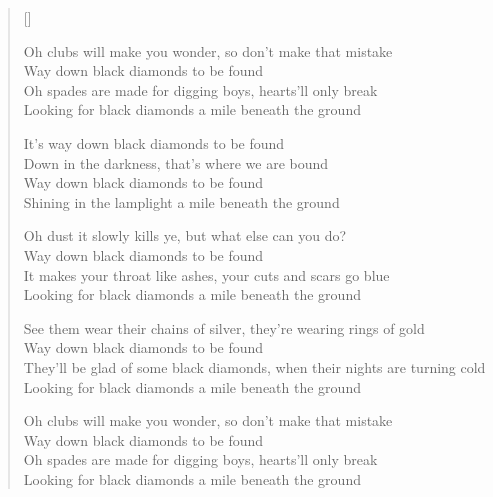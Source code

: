 \pagebreak
\settowidth{\versewidth}{See them wear their chains of silver, they're wearing rings of gold}
\begin{verse}[\versewidth]
\begin{altverse}
Oh clubs will make you wonder, so don't make that mistake\\
Way down black diamonds to be found\\
Oh spades are made for digging boys, hearts'll only break\\
Looking for black diamonds a mile beneath the ground
\end{altverse}

\begin{chorus}
It's way down black diamonds to be found\\
Down in the darkness, that's where we are bound\\
Way down black diamonds to be found\\
Shining in the lamplight a mile beneath the ground
\end{chorus}

\begin{altverse}
Oh dust it slowly kills ye, but what else can you do?\\
Way down black diamonds to be found\\
It makes your throat like ashes, your cuts and scars go blue\\
Looking for black diamonds a mile beneath the ground
\end{altverse}

\begin{altverse}
See them wear their chains of silver, they're wearing rings of gold\\
Way down black diamonds to be found\\
They'll be glad of some black diamonds, when their nights are turning cold\\
Looking for black diamonds a mile beneath the ground
\end{altverse}

\begin{altverse}
Oh clubs will make you wonder, so don't make that mistake\\
Way down black diamonds to be found\\
Oh spades are made for digging boys, hearts'll only break\\
Looking for black diamonds a mile beneath the ground
\end{altverse}

\end{verse}
